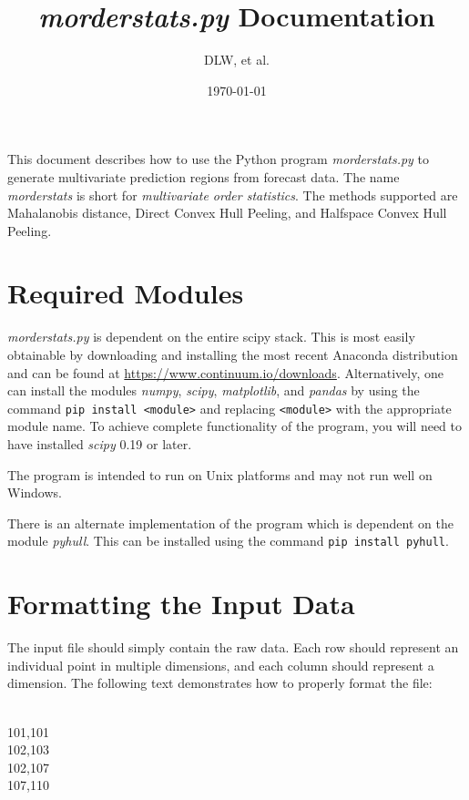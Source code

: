 \documentclass[11pt]{article}
\title{\textit{morderstats.py} Documentation}
\author{DLW, et al.}
\date{\today}
\begin{document}
\maketitle

This document describes how to use the Python program
\textit{morderstats.py} to generate multivariate prediction regions
from forecast data. The name \textit{morderstats} is short for
\textit{multivariate order statistics}. The methods supported are
Mahalanobis distance, Direct Convex Hull Peeling, and Halfspace Convex
Hull Peeling.

\section{Required Modules}

\textit{morderstats.py} is dependent on the entire scipy stack. This is most easily obtainable by downloading and installing the most recent Anaconda distribution and can be found at  \url{https://www.continuum.io/downloads}. Alternatively, one can install the modules \textit{numpy}, \textit{scipy}, \textit{matplotlib}, and \textit{pandas} by using the command \texttt{pip install <module>} and replacing \texttt{<module>} with the appropriate module name. To achieve complete functionality of the program, you will need to have installed \textit{scipy} 0.19 or later.

The program is intended to run on Unix platforms and may not run well on Windows.

There is an alternate implementation of the program which is dependent on the module \textit{pyhull}. This can be installed using the command \texttt{pip install pyhull}.

\section{Formatting the Input Data}

The input file should simply contain the raw data. Each row should represent an individual point in multiple dimensions, and each column should represent a dimension. The following text demonstrates how to properly format the file:

\begin{framed}
	\noindent
\\
101,101\\
102,103\\
102,107\\
107,110\\
\end{framed}
\end{document}
